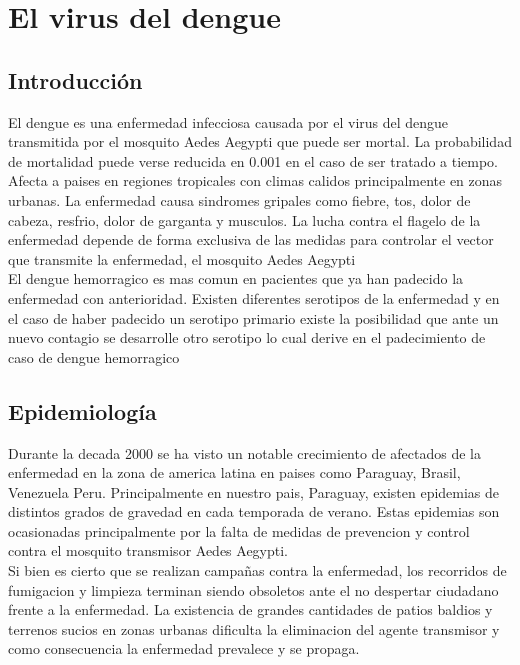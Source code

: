 
\section{El virus del dengue}

\subsection{Introducción}
El dengue es una enfermedad infecciosa causada por el virus del dengue transmitida por el mosquito Aedes Aegypti que puede ser mortal. La probabilidad de mortalidad puede verse reducida en 0.001 en el caso de ser tratado a tiempo.\\

Afecta a paises en regiones tropicales con climas calidos principalmente en zonas urbanas. La enfermedad causa sindromes gripales como fiebre, tos, dolor de cabeza, resfrio, dolor de garganta y musculos. La lucha contra el flagelo de la enfermedad depende de forma exclusiva de las medidas para controlar el vector que transmite la enfermedad, el mosquito Aedes Aegypti\\

El dengue hemorragico es mas comun en pacientes que ya han padecido la enfermedad con anterioridad. Existen diferentes serotipos de la enfermedad y en el caso de haber padecido un serotipo primario existe la posibilidad que ante un nuevo contagio se desarrolle otro serotipo lo cual derive en el padecimiento de caso de dengue hemorragico

\subsection{Epidemiología}

Durante la decada 2000 se ha visto un notable crecimiento de afectados de la enfermedad en la zona de america latina en paises como Paraguay, Brasil, Venezuela Peru. Principalmente en nuestro pais, Paraguay, existen epidemias  de distintos grados de gravedad en cada temporada de verano. Estas epidemias son ocasionadas principalmente por la falta de medidas de prevencion y control contra el mosquito transmisor Aedes Aegypti.\\

Si bien es cierto que se realizan campañas contra la enfermedad, los recorridos de fumigacion y limpieza terminan siendo obsoletos ante el no despertar ciudadano frente a la enfermedad. La existencia de grandes cantidades de patios baldios y terrenos sucios en zonas urbanas dificulta la eliminacion del agente transmisor y como consecuencia la enfermedad prevalece y se propaga.\\

